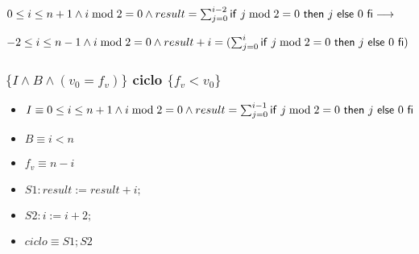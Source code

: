 \documentclass{article}
\begin{document}
    $0 \leq i \leq n+1 \wedge i \bmod 2 = 0 \wedge result = \sum_{j=0}^{i-2} \mathsf{if}\ j \bmod 2 = 0\ \mathsf{then}\ j\ \mathsf{else}\ 0\ \mathsf{fi} \longrightarrow$

    $-2 \leq i \leq n-1 \wedge i \bmod 2 = 0 \wedge result + i = (\sum_{j=0}^{i} \mathsf{if}\ j \bmod 2 = 0\ \mathsf{then}\ j\ \mathsf{else}\ 0\ \mathsf{fi})$

\subsubsection*{$\{I \wedge B \wedge (v_{0} = f_{v})\}$ ciclo $\{f_{v} < v_{0}\}$}

\begin{itemize}
    \item $I \equiv 0 \leq i \leq n+1 \wedge i \bmod 2 = 0 \wedge result = \sum_{j=0}^{i-1} \mathsf{if}\ j \bmod 2 = 0\ \mathsf{then}\ j\ \mathsf{else}\ 0\ \mathsf{fi}$
    \item $B \equiv i < n$
    \item $f_{v} \equiv n-i$
    \item $S1: result := result + i;$
    \item $S2: i := i + 2;$
    \item $ciclo \equiv S1; S2$
\end{itemize}
\end{document}
